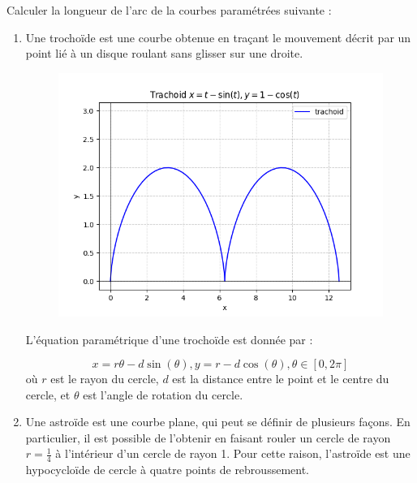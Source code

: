 \documentclass[a4paper,12pt]{article}
\begin{document}
Calculer la longueur de l'arc de la courbes paramétrées suivante :

\begin{enumerate}
\item
Une trochoïde est une courbe obtenue en traçant le mouvement décrit
par un point lié à un disque roulant sans glisser sur une droite.

  \begin{figure}[hb]
\centering
\includegraphics[scale=.5]{trachoid.png} 
  \label{pt graphic}
\end{figure}

L'équation paramétrique d'une trochoïde est donnée par :

$$x=r\theta - d\sin(\theta),y=r - d\cos(\theta), \theta \in [0,2\pi]$$
où $r$ est le rayon du cercle, $d$ est la distance entre le point et le centre du cercle, et $\theta$ est l'angle de rotation du cercle.

\item
Une astroïde est une courbe plane, qui peut se définir de plusieurs
façons. En particulier, il est possible de l'obtenir en faisant
rouler un cercle de rayon $r = \frac14$ à l'intérieur d'un cercle de rayon 1. Pour cette raison, l'astroïde est une hypocycloïde de cercle à quatre points de rebroussement.


\end{enumerate}
\end{document}

